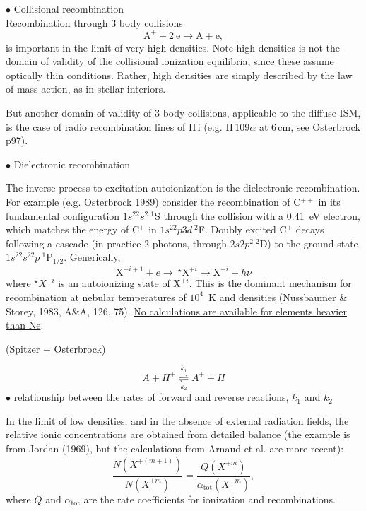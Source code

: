
{$\bullet$ Collisional recombination} \\

Recombination through 3 body collisions 
\[
 \mathrm{A^+} + 2~\mathrm{e}  \rightarrow \mathrm{A} + \mathrm{e}, 
\]
is important in the limit of very high densities. Note high densities
is not the domain of validity of the collisional ionization
equilibria, since these assume optically thin conditions. Rather, high
densities are simply described by the law of mass-action, as in
stellar interiors. 

But another domain of validity of 3-body collisions, applicable to the
diffuse ISM, is the case of radio recombination lines of H\,{\sc i}
(e.g. H\,109$\alpha$ at 6\,cm, see Osterbrock p97).



{$\bullet$ Dielectronic recombination}

The inverse process to excitation-autoionization is the dielectronic
recombination. For example (e.g. Osterbrock 1989) consider the
recombination of C$^{++}$ in its fundamental configuration
$1s^22s^2~^1$S through the collision with a 0.41~eV electron, which
matches the energy of C$^+$ in $1s^22p3d~^2$F. Doubly excited C$^{+}$
decays following a cascade (in practice 2 photons, through
$2s2p^2~^2$D) to the ground state $1s^22s^22p~^1$P$_{1/2}$.
Generically,
\[
\mathrm{X}^{+i+1} + e \rightarrow ~^{\star}\mathrm{X}^{+i} \rightarrow \mathrm{X}^{+i} + h\nu
\]
where $^{\star}X^{+i}$ is an autoionizing state of $\mathrm{X}^{+i}$.
This is the dominant mechanism for recombination at nebular
temperatures of $10^{4}$~K and densities (Nussbaumer \& Storey, 1983,
A\&A, 126, 75). \underline{No calculations are available for elements
heavier than Ne}.


(Spitzer + Osterbrock) 

\[
A  + H^+  \overset{k_1}{\underset{k_2}{\rightleftharpoons}} A^+ + H
\]
{$\bullet$ relationship between the rates of forward and reverse
reactions, $k_1$ and $k_2$}




In the limit of low densities, and in the absence of external
radiation fields, the relative ionic concentrations are obtained from
detailed balance (the example is from Jordan (1969), but the
calculations from Arnaud et al. are more recent):
\[
\frac{N(X^{+(m+1)})}{N(X^{+m})} =
\frac{Q(X^{+m})}{\alpha_\mathrm{tot}(X^{+m})},
\]
where $Q$ and $\alpha_\mathrm{tot}$ are the rate coefficients for
ionization and recombinations.

